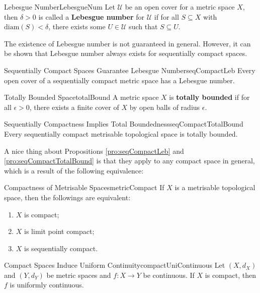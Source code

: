 \documentclass[math]{amznotes}
\theoremstyle{remark}
\begin{document}
\begin{dfnbox}{Lebesgue Number}{LebesgueNum}
    Let $\mathcal{U}$ be an open cover for a metric space $X$, then $\delta > 0$ is called a {\color{red} \textbf{Lebesgue number}} for $\mathcal{U}$ if for all $S \subseteq X$ with $\mathrm{diam}\left(S\right) < \delta$, there exists some $U \in \mathcal{U}$ such that $S \subseteq U$. 
\end{dfnbox}
The existence of Lebesgue number is not guaranteed in general. However, it can be shown that Lebesgue number always exists for sequentially compact spaces.
\begin{probox}{Sequentially Compact Spaces Guarantee Lebesgue Number}{seqCompactLeb}
    Every open cover of a sequentially compact metric space has a Lebesgue number.
\end{probox}
\begin{dfnbox}{Totally Bounded Space}{totalBound}
    A metric space $X$ is {\color{red} \textbf{totally bounded}} if for all $\epsilon > 0$, there exists a finite cover of $X$ by open balls of radius $\epsilon$.
\end{dfnbox}
\begin{probox}{Sequentially Compactness Implies Total Boundedness}{seqCompactTotalBound}
    Every sequentially compact metrisable topological space is totally bounded.
\end{probox}
A nice thing about Propositions \ref{pro:seqCompactLeb} and \ref{pro:seqCompactTotalBound} is that they apply to any compact space in general, which is a result of the following equivalence:
\begin{probox}{Compactness of Metrisable Spaces}{metricCompact}
    If $X$ is a metrisable topological space, then the followings are equivalent:
    \begin{enumerate}
        \item $X$ is compact;
        \item $X$ is limit point compact;
        \item $X$ is sequentially compact.
    \end{enumerate}
\end{probox} 
\begin{probox}{Compact Spaces Induce Uniform Continuity}{compactUniContinuous}
    Let $\left(X, d_X\right)$ and $\left(Y, d_Y\right)$ be metric spaces and $f \colon X \to Y$ be continuous. If $X$ is compact, then $f$ is uniformly continuous.
\end{probox}
\end{document}
